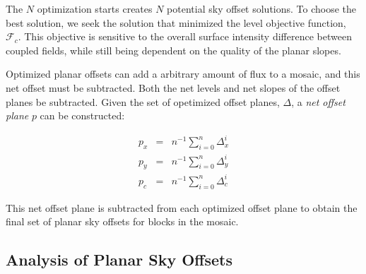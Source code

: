 \documentclass[iop]{emulateapj}
\begin{document}
The $N$ optimization starts creates $N$ potential sky offset solutions. To choose the best solution, we seek the solution that minimized the level objective function, $\mathcal{F}_c$. This objective is sensitive to the overall surface intensity difference between coupled fields, while still being dependent on the quality of the planar slopes.

Optimized planar offsets can add a arbitrary amount of flux to a mosaic, and this net offset must be subtracted. Both the net levels and net slopes of the offset planes be subtracted. Given the set of opetimized offset planes, $\Delta$, a \emph{net offset plane} $p$ can be constructed:

\begin{eqnarray}
	p_x & = & n^{-1} \sum_{i=0}^n \Delta_x^i \\
	p_y & = & n^{-1} \sum_{i=0}^n \Delta_y^i \\
	p_c & = & n^{-1} \sum_{i=0}^n \Delta_c^i
\end{eqnarray}

\noindent This net offset plane is subtracted from each optimized offset plane to obtain the final set of planar sky offsets for blocks in the mosaic.

\subsection{Analysis of Planar Sky Offsets}


\end{document}
